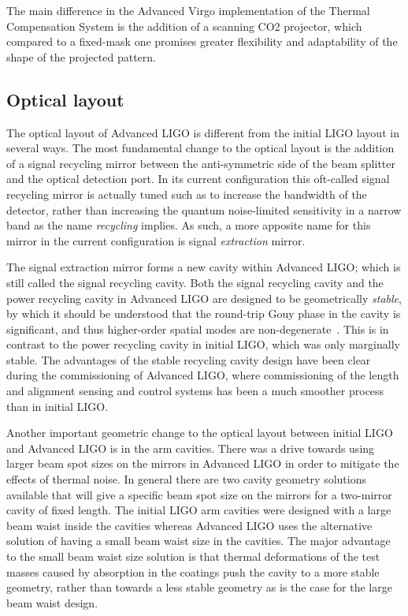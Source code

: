 The main difference in the Advanced Virgo implementation of the Thermal Compensation System is the addition of a scanning CO2 projector, which compared to a fixed-mask one promises greater flexibility and adaptability of the shape of the projected pattern.

\subsection{Optical layout}
The optical layout of Advanced LIGO is different from the initial LIGO layout in several ways. 
The most fundamental change to the optical layout is the addition of a signal recycling 
mirror between the anti-symmetric side of the beam splitter and the optical detection port. 
In its current configuration this oft-called signal recycling mirror is actually tuned such as to 
increase the bandwidth of the detector, rather than increasing the quantum noise-limited sensitivity
in a narrow band as the name \textit{recycling} implies. As such, a more apposite name for this mirror 
in the current configuration is signal \textit{extraction} mirror. 

The signal extraction mirror forms a new cavity within Advanced LIGO; which is still called the signal recycling cavity. 
Both the signal recycling cavity and the power recycling cavity in Advanced LIGO are designed to be 
geometrically \emph{stable}, by which it should be understood that the round-trip Gouy phase in the cavity 
is significant, and thus higher-order spatial modes are non-degenerate~\cite{Arain2008}. 
This is in contrast to the power recycling cavity in initial LIGO, which was only marginally stable. 
The advantages of the stable recycling cavity design have been clear during the commissioning of 
Advanced LIGO, where commissioning of the length and alignment sensing and control systems has 
been a much smoother process than in initial LIGO. 

Another important geometric change to the optical layout between initial LIGO and Advanced LIGO is 
in the arm cavities. There was a drive towards using larger beam spot sizes on the mirrors in Advanced 
LIGO in order to mitigate the effects of thermal noise. In general there are two cavity geometry solutions available 
that will give a specific beam spot size on the mirrors for a two-mirror cavity of fixed length. The initial LIGO 
arm cavities were designed with a large beam waist inside the cavities
whereas Advanced LIGO uses the alternative solution of having a small beam waist size in the cavities. 
The major advantage to the small beam waist size solution is that thermal deformations of the test masses caused by 
absorption in the coatings push the cavity to a more stable geometry, rather than towards a less stable geometry as 
is the case for the large beam waist design. 

